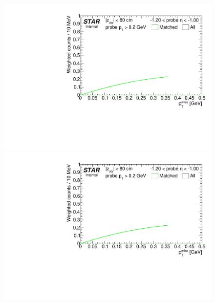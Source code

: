 \begin{figure}[ht]
{  \includegraphics[width=\linewidth,page=8]{graphics/correctionsToEff/TOF_tagAndProbe/Fitting_effVsEta_mc.CPT.pdf}\\
  \includegraphics[width=\linewidth,page=9]{graphics/correctionsToEff/TOF_tagAndProbe/Fitting_effVsEta_mc.CPT.pdf}\\
}%
\end{figure} 
